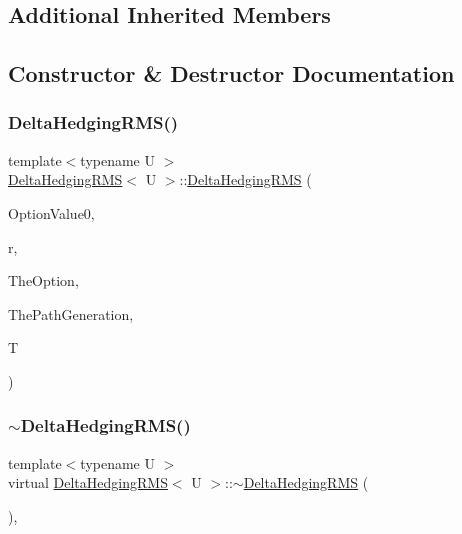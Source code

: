 \subsection*{Additional Inherited Members}


\subsection{Constructor \& Destructor Documentation}
\hypertarget{classDeltaHedgingRMS_a5b31d762316b99c787328394d28d90a0}{}\label{classDeltaHedgingRMS_a5b31d762316b99c787328394d28d90a0} 
\subsubsection{\texorpdfstring{Delta\+Hedging\+R\+M\+S()}{DeltaHedgingRMS()}}
{\footnotesize\ttfamily template$<$typename U $>$ \\
\hyperlink{classDeltaHedgingRMS}{Delta\+Hedging\+R\+MS}$<$ U $>$\+::\hyperlink{classDeltaHedgingRMS}{Delta\+Hedging\+R\+MS} (\begin{DoxyParamCaption}\item[{double}]{Option\+Value0,  }\item[{double}]{r,  }\item[{shared\+\_\+ptr$<$ U $>$}]{The\+Option,  }\item[{shared\+\_\+ptr$<$ \hyperlink{classPathGenerationHeston}{Path\+Generation\+Heston} $>$}]{The\+Path\+Generation,  }\item[{double}]{T }\end{DoxyParamCaption})}

\hypertarget{classDeltaHedgingRMS_a5d94af75ab8235dd533b5225ce7964e1}{}\label{classDeltaHedgingRMS_a5d94af75ab8235dd533b5225ce7964e1} 
\subsubsection{\texorpdfstring{$\sim$\+Delta\+Hedging\+R\+M\+S()}{~DeltaHedgingRMS()}}
{\footnotesize\ttfamily template$<$typename U $>$ \\
virtual \hyperlink{classDeltaHedgingRMS}{Delta\+Hedging\+R\+MS}$<$ U $>$\+::$\sim$\hyperlink{classDeltaHedgingRMS}{Delta\+Hedging\+R\+MS} (\begin{DoxyParamCaption}{ }\end{DoxyParamCaption})\hspace{0.3cm}{\ttfamily [inline]}, {\ttfamily [virtual]}}



